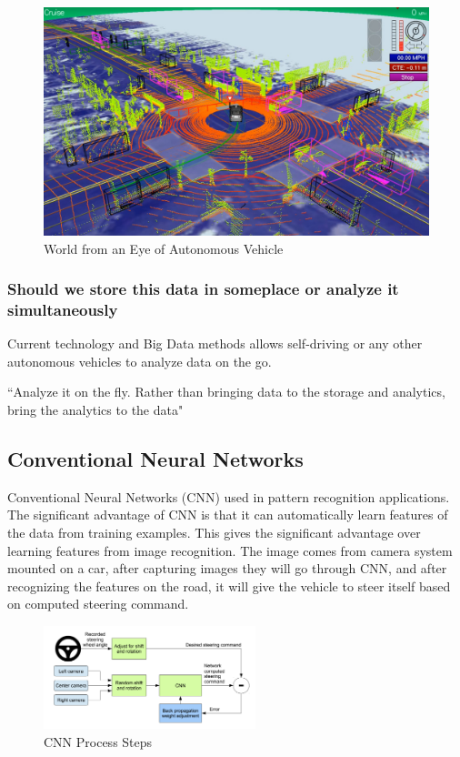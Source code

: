 \documentclass{acm_proc_article-sp}
\begin{document}
\begin{figure}[h]
  \centering
      \includegraphics[width=1.0\columnwidth]{images/picture4.jpg}
  \caption{World from an Eye of Autonomous Vehicle}\label{F:Lidar}
\end{figure}

\subsubsection{Should we store this data in someplace or analyze it simultaneously}
Current technology and Big Data methods allows self-driving or any other autonomous vehicles to analyze data on the go.\cite{www-sas} 
\begin{center}
    ``Analyze it on the fly. Rather than bringing data to the storage and analytics, bring the analytics to the data"\cite{www-sas}
\end{center}

\subsection{Conventional Neural Networks}

Conventional Neural Networks (CNN)\cite{nvidia} used in pattern recognition applications. The significant advantage of CNN is that it can automatically learn features of the data from training examples. \cite{nvidia} This gives the significant advantage over learning features from image recognition. The image comes from camera system mounted on a car, after capturing images they will go through CNN, and after recognizing the features on the road, it will give the vehicle to steer itself based on computed steering command.\cite{nvidia} 

\begin{figure}[!ht]
  \centering
      \includegraphics[width=1.0\columnwidth, height = 3cm]{images/picture11.png}
  \caption{CNN Process Steps}\label{F:nvidiaCNNmodel}
\end{figure}
\end{document}
